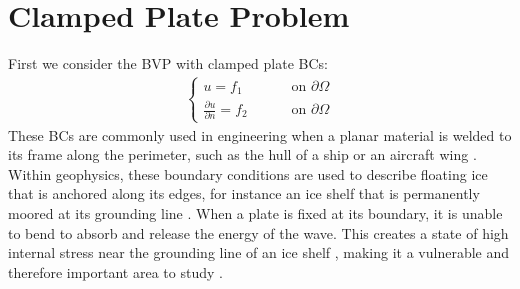 \documentclass[preprint,12pt,3p]{elsarticle}
\begin{document}
\section{Clamped Plate Problem} \label{clampedsection}

First we consider the BVP with clamped plate BCs:
\begin{align}
    \begin{cases}
    \displaystyle u = f_1 \qquad &\text{ on } \partial \Omega  \\
    \displaystyle \frac{\partial u}{\partial n}  = f_2 \qquad &\text{ on } \partial \Omega 
    \end{cases} \label{clampedbcs}
\end{align}
These BCs are commonly used in engineering when a planar material is welded to its frame along the perimeter, such as the hull of a ship \cite{lakitosh2012analysis} or an aircraft wing \cite{kapania2000static, giles}. Within geophysics, these boundary conditions are used to describe floating ice that is anchored along its edges, for instance an ice shelf that is permanently moored at its grounding line \cite{sergienko13, Nekrasov_MacAyeal_2023}. When a plate is fixed at its boundary, it is unable to bend to absorb and release the energy of the wave. This creates a state of high internal stress near the grounding line of an ice shelf \cite{sergienko17}, making it a vulnerable and therefore important area to study \cite{FRIEDL2020102948}. 
\end{document}
